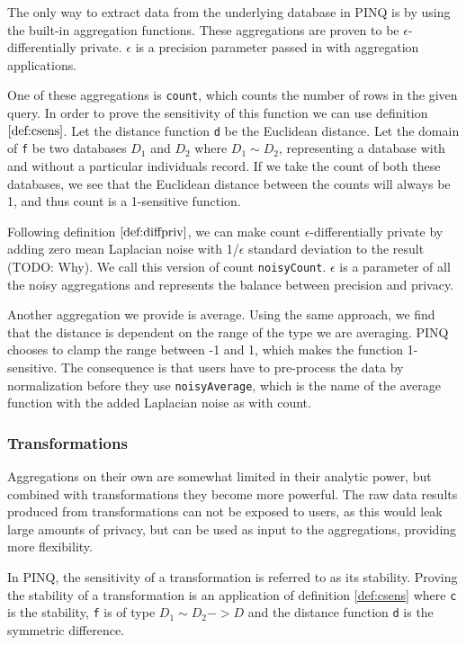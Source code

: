 \documentclass[12pt]{article}
\begin{document}
The only way to extract data from the underlying database in PINQ is by using the built-in aggregation functions.
These aggregations are proven to be $\epsilon$-differentially private.
$\epsilon$ is a precision parameter passed in with aggregation applications.

One of these aggregations is \texttt{count}, which counts the number of rows in the given query.
In order to prove the sensitivity of this function we can use definition $\ref{def:csens}$.
Let the distance function \texttt{d} be the Euclidean distance.
Let the domain of \texttt{f} be two databases $D_1$ and $D_2$ where $D_1 \sim D_2$, representing a database with and without a particular individuals record.
If we take the count of both these databases, we see that the Euclidean distance between the counts will always be 1, and thus count is a 1-sensitive function.

Following definition $\ref{def:diffpriv}$, we can make count $\epsilon$-differentially private by adding zero mean Laplacian noise with 1/$\epsilon$ standard deviation to the result (TODO: Why).
We call this version of count \texttt{noisyCount}.
$\epsilon$ is a parameter of all the noisy aggregations and represents the balance between precision and privacy.

Another aggregation we provide is average.
Using the same approach, we find that the distance is dependent on the range of the type we are averaging.
PINQ chooses to clamp the range between -1 and 1, which makes the function 1-sensitive.
The consequence is that users have to pre-process the data by normalization before they use \texttt{noisyAverage}, which is the name of the average function with the added Laplacian noise as with count.

\subsubsection{Transformations}

Aggregations on their own are somewhat limited in their analytic power, but combined with transformations they become more powerful.
The raw data results produced from transformations can not be exposed to users, as this would leak large amounts of privacy, but can be used as input to the aggregations, providing more flexibility.

In PINQ, the sensitivity of a transformation is referred to as its stability.
Proving the stability of a transformation is an application of definition \ref{def:csens} where \texttt{c} is the stability, \texttt{f} is of type  $D_1 \sim D_2 -> D$ and the distance function \texttt{d} is the symmetric difference.
\end{document}
